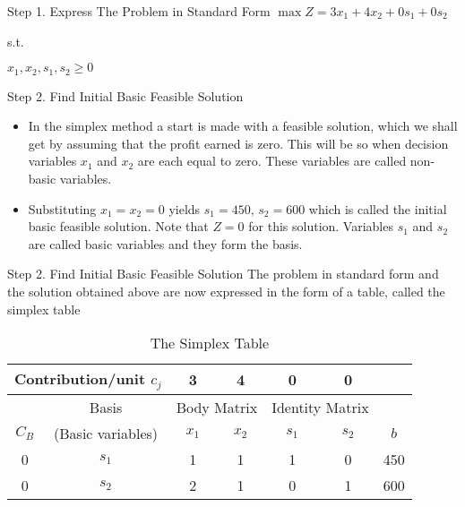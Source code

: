 \begin{frame}{Step 1. Express The Problem in Standard Form}{}
    $\max Z = 3x_1 + 4x_2 + 0s_1 + 0s_2$

  s.t.

$    x_1, x_2, s_1, s_2  \geq 0$
\end{frame}

\begin{frame}{Step 2. Find Initial Basic Feasible Solution}
  \begin{itemize} \justifying
  \item In the simplex method a start is made with a feasible
    solution, which we shall get by assuming that the profit earned is
    zero. This will be so when decision variables \alert{$x_1$ and
      $x_2$ are each equal to zero}. \alert{These variables are called
      non-basic variables}. 
  \item Substituting $x_1 = x_2 = 0$ yields
    $s_1 = 450, \, s_2 = 600$ which \alert{is called the initial basic
      feasible solution}. Note that $Z=0$ for this
    solution. \alert{Variables $s_1$ and $s_2$ are called basic
      variables and they form the basis}.
\end{itemize}

\end{frame}

\begin{frame}{Step 2. Find Initial Basic Feasible Solution}
  The problem in standard form and the solution obtained above are now expressed in the form of a table, called the simplex table

  \begin{table}[h]
    \centering
    \caption{The Simplex Table}    \label{tab:simplex-table}
    \begin{tabular}{ccccccc}
      \toprule
      \multicolumn{2}{c}{Contribution/unit $c_j$}  &3 &4 &0 &0 & \\
      \midrule
                                                   &Basis&\multicolumn{2}{c}{Body Matrix}&\multicolumn{2}{c}{Identity Matrix}&\\
      \cmidrule{3-6}
      $C_B$ &(Basic variables)&$x_1$&$x_2$&$s_1$&$s_2$&$b$\\
      \midrule
      0&$s_1$&1&1&1&0&450\\
      0&$s_2$&2&1&0&1&600\\
      \bottomrule
    \end{tabular}
  \end{table}
\end{frame}

